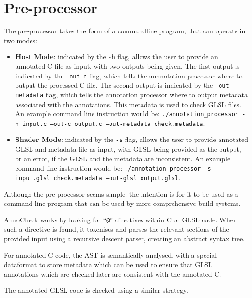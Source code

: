\documentclass[a4paper,12pt,twoside,openright]{report}
\begin{document}
\section{Pre-processor}

The pre-processor takes the form of a commandline program, that can operate
in two modes:

\begin{itemize}

    \item \textbf{Host Mode}: indicated by the \texttt{-h} flag, allows the
    user to provide an annotated C file as input, with two outputs being given.
    The first output is indicated by the \texttt{--out-c} flag, which tells the
    annnotation processor where to output the processed C file. The second
    output is indicated by the \texttt{--out-metadata} flag, which tells the
    annotation processor where to output metadata associated with the
    annotations. This metadata is used to check GLSL files. An example command
    line instruction would be: \texttt{./annotation\_processor -h input.c
    --out-c output.c --out-metadata check.metadata}.

    \item \textbf{Shader Mode}: indicated by the \texttt{-s} flag, allows the
    user to provide annotated GLSL and metadata file as input, with GLSL being
    provided as the output, or an error, if the GLSL and the metadata are
    inconsistent. An example command line instruction would be:
    \texttt{./annotation\_processor -s input.glsl check.metadata --out-glsl
    output.glsl}.

\end{itemize}

Although the pre-processor seems simple, the intention is for it to be used as
a command-line program that can be used by more comprehensive build systems.

AnnoCheck works by looking for ``\texttt{@}'' directives within C or GLSL code.
When such a directive is found, it tokenises and parses the relevant sections
of the provided input using a recursive descent parser, creating an abstract
syntax tree.

For annotated C code, the AST is semantically analysed, with a special
dataformat to store metadata which can be used to ensure that GLSL annotations
which are checked later are consistent with the annotated C.

The annotated GLSL code is checked using a similar strategy.
\end{document}
